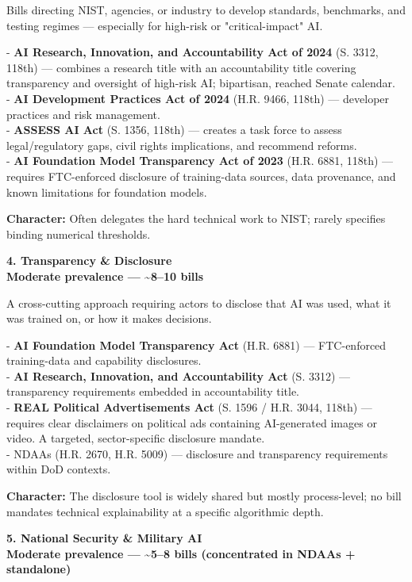 \documentclass[11pt]{article}
\begin{document}
Bills directing NIST, agencies, or industry to develop standards, benchmarks, and testing regimes --- especially for high-risk or "critical-impact" AI.

- \textbf{AI Research, Innovation, and Accountability Act of 2024} (S. 3312, 118th) --- combines a research title with an accountability title covering transparency and oversight of high-risk AI; bipartisan, reached Senate calendar. \\
- \textbf{AI Development Practices Act of 2024} (H.R. 9466, 118th) --- developer practices and risk management. \\
- \textbf{ASSESS AI Act} (S. 1356, 118th) --- creates a task force to assess legal/regulatory gaps, civil rights implications, and recommend reforms. \\
- \textbf{AI Foundation Model Transparency Act of 2023} (H.R. 6881, 118th) --- requires FTC-enforced disclosure of training-data sources, data provenance, and known limitations for foundation models.

\textbf{Character:} Often delegates the hard technical work to NIST; rarely specifies binding numerical thresholds.

\textbf{4. Transparency \& Disclosure} \\
\textbf{Moderate prevalence --- \textasciitilde{}8--10 bills}

A cross-cutting approach requiring actors to disclose that AI was used, what it was trained on, or how it makes decisions.

- \textbf{AI Foundation Model Transparency Act} (H.R. 6881) --- FTC-enforced training-data and capability disclosures. \\
- \textbf{AI Research, Innovation, and Accountability Act} (S. 3312) --- transparency requirements embedded in accountability title. \\
- \textbf{REAL Political Advertisements Act} (S. 1596 / H.R. 3044, 118th) --- requires clear disclaimers on political ads containing AI-generated images or video. A targeted, sector-specific disclosure mandate. \\
- NDAAs (H.R. 2670, H.R. 5009) --- disclosure and transparency requirements within DoD contexts.

\textbf{Character:} The disclosure tool is widely shared but mostly process-level; no bill mandates technical explainability at a specific algorithmic depth.

\textbf{5. National Security \& Military AI} \\
\textbf{Moderate prevalence --- \textasciitilde{}5--8 bills (concentrated in NDAAs + standalone)}
\end{document}
